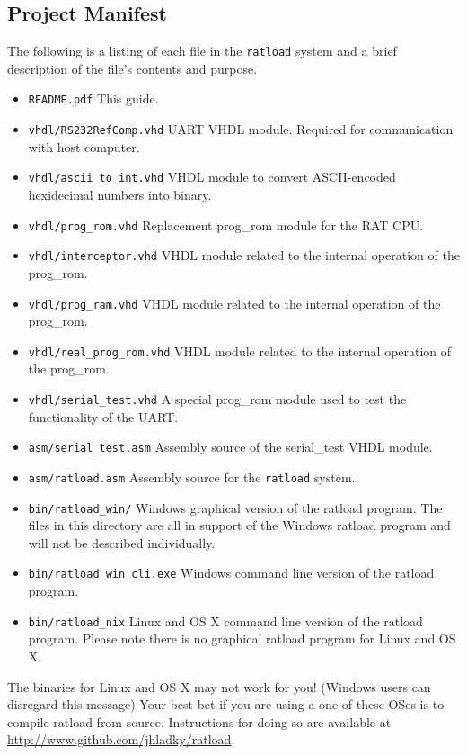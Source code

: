 \documentclass[notitlepage]{article}
\newcommand{\infosign}{\fontencoding{U}\fontfamily{futs}\huge\selectfont\char 116\relax}
\begin{document}
\subsection{Project Manifest}
The following is a listing of each file in the \texttt{ratload} system and a brief description of the file's contents and purpose.
\begin{itemize}
\item \texttt{README.pdf} This guide.
\item \texttt{vhdl/RS232RefComp.vhd} UART VHDL module. Required for communication with host computer.
\item \texttt{vhdl/ascii\_to\_int.vhd} VHDL module to convert ASCII-encoded hexidecimal numbers into binary.
\item \texttt{vhdl/prog\_rom.vhd} Replacement prog\_rom module for the RAT CPU.
\item \texttt{vhdl/interceptor.vhd} VHDL module related to the internal operation of the prog\_rom.
\item \texttt{vhdl/prog\_ram.vhd} VHDL module related to the internal operation of the prog\_rom.
\item \texttt{vhdl/real\_prog\_rom.vhd} VHDL module related to the internal operation of the prog\_rom.
\item \texttt{vhdl/serial\_test.vhd} A special prog\_rom module used to test the functionality of the UART.
\item \texttt{asm/serial\_test.asm} Assembly source of the serial\_test VHDL module.
\item \texttt{asm/ratload.asm} Assembly source for the \texttt{ratload} system.
\item \texttt{bin/ratload\_win/} Windows graphical version of the ratload program. The files in this directory are all in support of the Windows ratload program and will not be described individually.
\item \texttt{bin/ratload\_win\_cli.exe} Windows command line version of the ratload program.
\item \texttt{bin/ratload\_nix} Linux and OS X command line version of the ratload program. Please note there is no graphical ratload program for Linux and OS X.
\end{itemize}

\begin{infobox}
  {\infosign} The binaries for Linux and OS X may not work for you! (Windows users can disregard this message) Your best bet if you are using a one of these OSes is to compile ratload from source. Instructions for doing so are available at \url{http://www.github.com/jhladky/ratload}.
\end{infobox}
\end{document}
